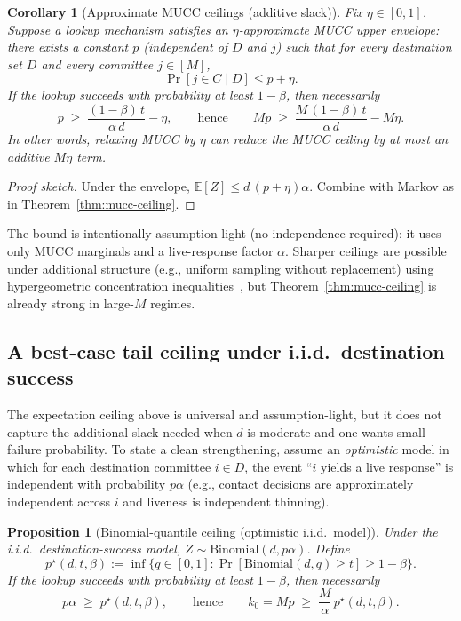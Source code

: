 \documentclass[11pt]{article}
\newtheorem{corollary}{Corollary}
\newtheorem{proposition}{Proposition}
\newcommand{\E}{\mathbb{E}}
\begin{document}
\begin{corollary}[Approximate MUCC ceilings (additive slack)]
\label{cor:approx-mucc}
Fix $\eta\in[0,1]$.
Suppose a lookup mechanism satisfies an \emph{$\eta$-approximate MUCC upper envelope}:
there exists a constant $p$ (independent of $D$ and $j$) such that for every destination set $D$ and every committee $j\in[M]$,
\[
\Pr[j\in C\mid D] \le p+\eta.
\]
If the lookup succeeds with probability at least $1-\beta$, then necessarily
\[
p \;\ge\; \frac{(1-\beta)\,t}{\alpha\,d}-\eta,
\qquad\text{hence}\qquad
Mp \;\ge\; \frac{M\,(1-\beta)\,t}{\alpha\,d}-M\eta.
\]
In other words, relaxing MUCC by $\eta$ can reduce the MUCC ceiling by at most an additive $M\eta$ term.
\end{corollary}

\begin{proof}[Proof sketch]
Under the envelope, $\E[Z]\le d\,(p+\eta)\alpha$.
Combine with Markov as in Theorem~\ref{thm:mucc-ceiling}.
\end{proof}


The bound is intentionally assumption-light (no independence required): it uses only MUCC marginals and a live-response factor $\alpha$.
Sharper ceilings are possible under additional structure (e.g., uniform sampling without replacement) using hypergeometric concentration inequalities~\cite{serfling1974sampling,bardenet2015withoutreplacement}, but Theorem~\ref{thm:mucc-ceiling} is already strong in large-$M$ regimes.


\subsection{A best-case tail ceiling under i.i.d.\ destination success}
The expectation ceiling above is universal and assumption-light, but it does not capture the additional slack needed when $d$ is moderate and one wants small failure probability.
To state a clean strengthening, assume an \emph{optimistic} model in which for each destination committee $i\in D$,
the event ``$i$ yields a live response'' is independent with probability $p\alpha$ (e.g., contact decisions are approximately independent across $i$ and liveness is independent thinning).

\begin{proposition}[Binomial-quantile ceiling (optimistic i.i.d.\ model)]
\label{prop:binom-quantile-ceiling}
Under the i.i.d.\ destination-success model, $Z\sim \mathrm{Binomial}(d,p\alpha)$.
Define
\[
p^\star(d,t,\beta) := \inf\{q\in[0,1] : \Pr[\mathrm{Binomial}(d,q)\ge t]\ge 1-\beta\}.
\]
If the lookup succeeds with probability at least $1-\beta$, then necessarily
\[
p\alpha \;\ge\; p^\star(d,t,\beta),
\qquad\text{hence}\qquad
k_0 = Mp \;\ge\; \frac{M}{\alpha}\,p^\star(d,t,\beta).
\]
\end{proposition}
\end{document}
